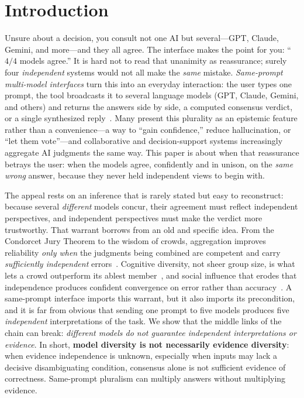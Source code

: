 \documentclass[acmsmall,screen,nonacm]{acmart}
\begin{document}
\section{Introduction}
\label{sec:intro}
Unsure about a decision, you consult not one AI but several---GPT, Claude, Gemini, and more---and they all
agree. The interface makes the point for you: ``$4/4$ models agree.'' It is hard not to read that unanimity
as reassurance; surely four \emph{independent} systems would not all make the \emph{same} mistake.
\emph{Same-prompt multi-model interfaces} turn this into an everyday interaction: the user types one prompt,
the tool broadcasts it to several language models (GPT, Claude, Gemini, and others) and returns the answers
side by side, a computed consensus verdict, or a single synthesized
reply~\cite{chathub2026,openwebui2026multimodel,promptquorum2026home,multiplechat2026,poe2024multibot,googleaistudio2024compare}.
Many present this plurality as an epistemic feature rather than a convenience---a way to ``gain confidence,''
reduce hallucination, or ``let them vote''---and collaborative and decision-support systems increasingly
aggregate AI judgments the same way. This paper is about when that reassurance betrays the user: when the
models agree, confidently and in unison, on the \emph{same wrong} answer, because they never held independent
views to begin with.

The appeal rests on an inference that is rarely stated but easy to reconstruct: because several
\emph{different} models concur, their agreement must reflect independent perspectives, and independent
perspectives must make the verdict more trustworthy. That warrant borrows from an old and
specific idea. From the Condorcet Jury Theorem to the wisdom of crowds, aggregation improves reliability
\emph{only when} the judgments being combined are competent and carry \emph{sufficiently independent}
errors~\cite{condorcet,ladha1992,surowiecki2004}. Cognitive diversity, not sheer group size, is
what lets a crowd outperform its ablest member~\cite{hongpage2004}, and social influence that erodes that
independence produces confident convergence on error rather than accuracy~\cite{lorenz2011}. A same-prompt interface imports this warrant,
but it also imports its precondition, and it is far from obvious that sending one prompt to five models
produces five \emph{independent} interpretations of the task. We show that the middle links of the chain can
break: \emph{different models do not guarantee independent interpretations or evidence}. In short,
\textbf{model diversity is not necessarily evidence diversity}: when evidence
independence is unknown, especially when inputs may lack a decisive disambiguating condition, consensus alone
is not sufficient evidence of correctness. Same-prompt pluralism can multiply answers without multiplying evidence.
\end{document}
